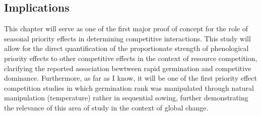 \documentclass[12pt]{article}\usepackage[]{graphicx}\usepackage[]{color}
\begin{document}
\subsection*{Implications}
\indent\indent This chapter will serve as one of the first major proof of concept for the role of seasonal priority effects in determining competitive interactions. This study will allow for the direct quantification of the proportionate strength of phenological priority effects to other competitive effects in the context of resource competition, clarifying the reported association bewtween rapid germination and competitive dominance. Furthermore, as far as I know, it will be one of the first priority effect competition studies in which germination rank was manipulated through natural manipulation (temperature) rather in sequential sowing, further demonstrating the relevance of this area of study in the context of global change.
\end{document}
